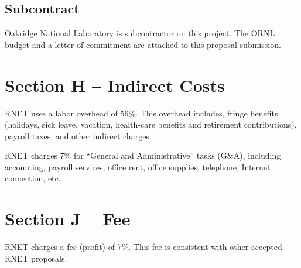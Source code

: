 \subsection{Subcontract}

Oakridge National Laboratory is subcontractor on this project. The ORNL budget
and a letter of commitment are attached to this proposal submission.

\section{Section H -- Indirect Costs}
RNET uses a labor overhead of 56\%. This overhead includes, fringe
benefits (holidays, sick leave, vacation, health-care benefits and
retirement contributions), payroll taxes, and other indirect charges.

RNET charges 7\% for ``General and Administrative'' tasks (G\&A),
including accounting, payroll services, office rent, office supplies,
telephone, Internet connection, etc.

\section{Section J -- Fee}
RNET charges a fee (profit) of 7\%.  This fee is consistent with other
accepted RNET proposals.



